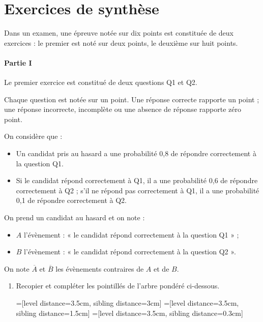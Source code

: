\documentclass[11pt,fleqn, openany]{book} %
\begin{document}

\section*{Exercices de synthèse}

\begin{exercise}[topic=lgn04, subtitle={(Sujet zéro 2024)}]

Dans un examen, une épreuve notée sur dix points est constituée de deux exercices : le premier est noté sur deux points, le deuxième sur huit points.

\paragraph{Partie I}

Le premier exercice est constitué de deux questions Q1 et Q2.

Chaque question est notée sur un point. Une réponse correcte rapporte un point ; une réponse incorrecte, incomplète ou une absence de réponse rapporte zéro point.

On considère que :
\begin{itemize}
\item Un candidat pris au hasard a une probabilité 0,8 de répondre correctement à la question Q1.
\item Si le candidat répond correctement à Q1, il a une probabilité 0,6 de répondre correctement à Q2 ; s'il ne répond pas correctement à Q1, il a une probabilité 0,1 de
répondre correctement à Q2.\end{itemize}

On prend un candidat au hasard et on note :
\begin{itemize}
\item $A$ l'évènement : « le candidat répond correctement à la question Q1 » ;
\item $B$ l'évènement : « le candidat répond correctement à la question Q2 ».
\end{itemize}

On note $\overline{A}$ et $\overline{B}$ les évènements contraires de $A$ et de $B$.

\begin{enumerate}
\item Recopier et compléter les pointillés de l'arbre pondéré ci-dessous.

=[level distance=3.5cm, sibling distance=3cm]
=[level distance=3.5cm, sibling distance=1.5cm]
=[level distance=3.5cm, sibling distance=0.3cm]


\end{enumerate}
\end{exercise}
\end{document}
